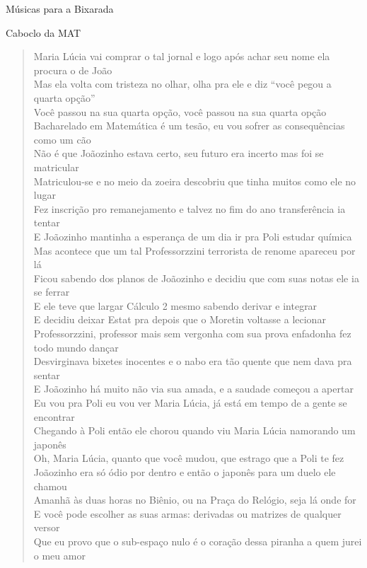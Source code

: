 \begin{secao}{Músicas para a Bixarada}
\begin{subsecao}{Caboclo da MAT}
\begin{verse}
{Maria Lúcia vai comprar o tal jornal e logo após achar seu nome ela procura o de
João\\
Mas ela volta com tristeza no olhar, olha pra ele e diz ``você pegou a quarta
opção''\\
Você passou na sua quarta opção, você passou na sua quarta opção\\
Bacharelado em Matemática é um tesão, eu vou sofrer as consequências como um cão\\
Não é que Joãozinho estava certo, seu futuro era incerto mas foi se matricular\\
Matriculou-se e no meio da zoeira descobriu que tinha muitos como ele no lugar\\
Fez inscrição pro remanejamento e talvez no fim do ano transferência ia tentar\\
E Joãozinho mantinha a esperança de um dia ir pra Poli estudar química\\
Mas acontece que um tal Professorzzini terrorista de renome apareceu por lá\\
Ficou sabendo dos planos de Joãozinho e decidiu que com suas notas ele ia se
ferrar\\
E ele teve que largar Cálculo 2 mesmo sabendo derivar e integrar\\
E decidiu deixar Estat pra depois que o Moretin voltasse a lecionar\\
Professorzzini, professor mais sem vergonha com sua prova enfadonha fez todo
mundo dançar\\
Desvirginava bixetes inocentes e o nabo era tão quente que nem dava pra sentar\\
E Joãozinho há muito não via sua amada, e a saudade começou a apertar\\
Eu vou pra Poli eu vou ver Maria Lúcia, já está em tempo de a gente se encontrar\\
Chegando à Poli então ele chorou quando viu Maria Lúcia namorando um japonês\\
Oh, Maria Lúcia, quanto que você mudou, que estrago que a Poli te fez\\
Joãozinho era só ódio por dentro e então o japonês para um duelo ele chamou\\
Amanhã às duas horas no Biênio, ou na Praça do Relógio, seja lá onde for\\
E você pode escolher as suas armas: derivadas ou matrizes de qualquer versor\\
Que eu provo que o sub-espaço nulo é o coração dessa piranha a quem jurei o meu
amor\\
}
\end{verse}
\end{subsecao}
\end{secao}
